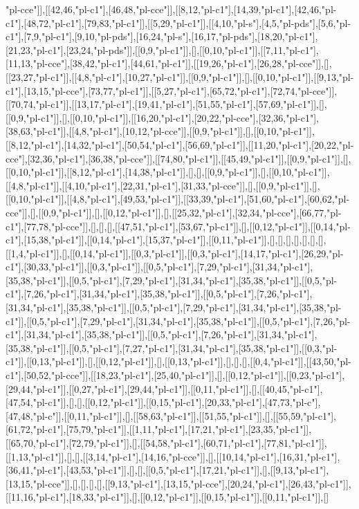 "pl-cce"]],[[42,46,"pl-c1"],[46,48,"pl-cce"]],[[8,12,"pl-c1"],[14,39,"pl-c1"],[42,46,"pl-c1"],[48,72,"pl-c1"],[79,83,"pl-c1"]],[[5,29,"pl-c1"]],[[4,10,"pl-s"],[4,5,"pl-pds"],[5,6,"pl-c1"],[7,9,"pl-c1"],[9,10,"pl-pds"],[16,24,"pl-s"],[16,17,"pl-pds"],[18,20,"pl-c1"],[21,23,"pl-c1"],[23,24,"pl-pds"]],[[0,9,"pl-c1"]],[],[[0,10,"pl-c1"]],[[7,11,"pl-c1"],[11,13,"pl-cce"],[38,42,"pl-c1"],[44,61,"pl-c1"]],[[19,26,"pl-c1"],[26,28,"pl-cce"]],[],[[23,27,"pl-c1"]],[[4,8,"pl-c1"],[10,27,"pl-c1"]],[[0,9,"pl-c1"]],[],[[0,10,"pl-c1"]],[[9,13,"pl-c1"],[13,15,"pl-cce"],[73,77,"pl-c1"]],[[5,27,"pl-c1"],[65,72,"pl-c1"],[72,74,"pl-cce"]],[[70,74,"pl-c1"]],[[13,17,"pl-c1"],[19,41,"pl-c1"],[51,55,"pl-c1"],[57,69,"pl-c1"]],[],[[0,9,"pl-c1"]],[],[[0,10,"pl-c1"]],[[16,20,"pl-c1"],[20,22,"pl-cce"],[32,36,"pl-c1"],[38,63,"pl-c1"]],[[4,8,"pl-c1"],[10,12,"pl-cce"]],[[0,9,"pl-c1"]],[],[[0,10,"pl-c1"]],[[8,12,"pl-c1"],[14,32,"pl-c1"],[50,54,"pl-c1"],[56,69,"pl-c1"]],[[11,20,"pl-c1"],[20,22,"pl-cce"],[32,36,"pl-c1"],[36,38,"pl-cce"]],[[74,80,"pl-c1"]],[[45,49,"pl-c1"]],[[0,9,"pl-c1"]],[],[[0,10,"pl-c1"]],[[8,12,"pl-c1"],[14,38,"pl-c1"]],[],[],[[0,9,"pl-c1"]],[],[[0,10,"pl-c1"]],[[4,8,"pl-c1"]],[[4,10,"pl-c1"],[22,31,"pl-c1"],[31,33,"pl-cce"]],[],[[0,9,"pl-c1"]],[],[[0,10,"pl-c1"]],[[4,8,"pl-c1"],[49,53,"pl-c1"]],[[33,39,"pl-c1"],[51,60,"pl-c1"],[60,62,"pl-cce"]],[],[[0,9,"pl-c1"]],[],[[0,12,"pl-c1"]],[],[[25,32,"pl-c1"],[32,34,"pl-cce"],[66,77,"pl-c1"],[77,78,"pl-cce"]],[],[],[],[[47,51,"pl-c1"],[53,67,"pl-c1"]],[],[[0,12,"pl-c1"]],[[0,14,"pl-c1"],[15,38,"pl-c1"]],[[0,14,"pl-c1"],[15,37,"pl-c1"]],[[0,11,"pl-c1"]],[],[],[],[],[],[],[],[[1,4,"pl-c1"]],[],[[0,14,"pl-c1"]],[[0,3,"pl-c1"]],[[0,3,"pl-c1"],[14,17,"pl-c1"],[26,29,"pl-c1"],[30,33,"pl-c1"]],[[0,3,"pl-c1"]],[[0,5,"pl-c1"],[7,29,"pl-c1"],[31,34,"pl-c1"],[35,38,"pl-c1"]],[[0,5,"pl-c1"],[7,29,"pl-c1"],[31,34,"pl-c1"],[35,38,"pl-c1"]],[[0,5,"pl-c1"],[7,26,"pl-c1"],[31,34,"pl-c1"],[35,38,"pl-c1"]],[[0,5,"pl-c1"],[7,26,"pl-c1"],[31,34,"pl-c1"],[35,38,"pl-c1"]],[[0,5,"pl-c1"],[7,29,"pl-c1"],[31,34,"pl-c1"],[35,38,"pl-c1"]],[[0,5,"pl-c1"],[7,29,"pl-c1"],[31,34,"pl-c1"],[35,38,"pl-c1"]],[[0,5,"pl-c1"],[7,26,"pl-c1"],[31,34,"pl-c1"],[35,38,"pl-c1"]],[[0,5,"pl-c1"],[7,26,"pl-c1"],[31,34,"pl-c1"],[35,38,"pl-c1"]],[[0,5,"pl-c1"],[7,27,"pl-c1"],[31,34,"pl-c1"],[35,38,"pl-c1"]],[[0,3,"pl-c1"]],[[0,13,"pl-c1"]],[],[[0,12,"pl-c1"]],[],[[0,13,"pl-c1"]],[],[],[],[[0,4,"pl-c1"]],[[43,50,"pl-c1"],[50,52,"pl-cce"]],[[18,23,"pl-c1"],[25,40,"pl-c1"]],[],[[0,12,"pl-c1"]],[[0,23,"pl-c1"],[29,44,"pl-c1"]],[[0,27,"pl-c1"],[29,44,"pl-c1"]],[[0,11,"pl-c1"]],[],[[40,45,"pl-c1"],[47,54,"pl-c1"]],[],[],[[0,12,"pl-c1"]],[[0,15,"pl-c1"],[20,33,"pl-c1"],[47,73,"pl-c"],[47,48,"pl-c"]],[[0,11,"pl-c1"]],[],[[58,63,"pl-c1"]],[[51,55,"pl-c1"]],[],[[55,59,"pl-c1"],[61,72,"pl-c1"],[75,79,"pl-c1"]],[[1,11,"pl-c1"],[17,21,"pl-c1"],[23,35,"pl-c1"]],[[65,70,"pl-c1"],[72,79,"pl-c1"]],[],[[54,58,"pl-c1"],[60,71,"pl-c1"],[77,81,"pl-c1"]],[[1,13,"pl-c1"]],[],[],[[3,14,"pl-c1"],[14,16,"pl-cce"]],[],[[10,14,"pl-c1"],[16,31,"pl-c1"],[36,41,"pl-c1"],[43,53,"pl-c1"]],[],[],[[0,5,"pl-c1"],[17,21,"pl-c1"]],[],[[9,13,"pl-c1"],[13,15,"pl-cce"]],[],[],[],[],[[9,13,"pl-c1"],[13,15,"pl-cce"],[20,24,"pl-c1"],[26,43,"pl-c1"]],[[11,16,"pl-c1"],[18,33,"pl-c1"]],[],[[0,12,"pl-c1"]],[[0,15,"pl-c1"]],[[0,11,"pl-c1"]],[]